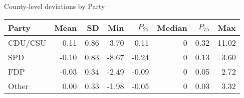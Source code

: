 

\caption{County-level deviations by Party}
\centering
\begin{tabular}[t]{lrrrrrrr}
\toprule
Party & Mean & SD & Min & $P_{25}$ & Median & $P_{75}$ & Max\\
\midrule
CDU/CSU & 0.11 & 0.86 & -3.70 & -0.11 & 0 & 0.32 & 11.02\\
SPD & -0.10 & 0.83 & -8.67 & -0.24 & 0 & 0.13 & 3.60\\
FDP & -0.03 & 0.34 & -2.49 & -0.09 & 0 & 0.05 & 2.72\\
Other & 0.00 & 0.33 & -1.98 & -0.05 & 0 & 0.03 & 3.32\\
\bottomrule
\end{tabular}
